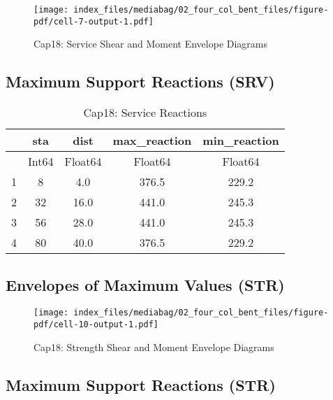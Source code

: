\documentclass[
  letterpaper,
  DIV=11,
  numbers=noendperiod]{scrreprt}
\begin{document}
\begin{figure}[H]

{\centering \texttt{[image: index\_files/mediabag/02\_four\_col\_bent\_files/figure-pdf/cell-7-output-1.pdf]}

}

\caption{Cap18: Service Shear and Moment Envelope Diagrams}

\end{figure}%

\subsection{Maximum Support Reactions
(SRV)}\label{maximum-support-reactions-srv}

\begin{table}
\caption{Cap18: Service Reactions}\tabularnewline

\centering
\begin{tabular}{r|cccc}
    & sta & dist & max\_reaction & min\_reaction\\
    \hline
    & Int64 & Float64 & Float64 & Float64\\
    \hline
    1 & 8 & 4.0 & 376.5 & 229.2 \\
    2 & 32 & 16.0 & 441.0 & 245.3 \\
    3 & 56 & 28.0 & 441.0 & 245.3 \\
    4 & 80 & 40.0 & 376.5 & 229.2 \\
\end{tabular}
\end{table}

\subsection{Envelopes of Maximum Values
(STR)}\label{envelopes-of-maximum-values-str}

\begin{figure}[H]

{\centering \texttt{[image: index\_files/mediabag/02\_four\_col\_bent\_files/figure-pdf/cell-10-output-1.pdf]}

}

\caption{Cap18: Strength Shear and Moment Envelope Diagrams}

\end{figure}%

\subsection{Maximum Support Reactions
(STR)}\label{maximum-support-reactions-str}
\end{document}
